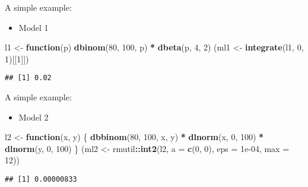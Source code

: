 \documentclass[12pt,ignorenonframetext,aspectratio=169]{beamer}
\newenvironment{Shaded}{\begin{snugshade}}{\end{snugshade}}
\newcommand{\ControlFlowTok}[1]{\textcolor[rgb]{0.13,0.29,0.53}{\textbf{#1}}}
\newcommand{\DataTypeTok}[1]{\textcolor[rgb]{0.13,0.29,0.53}{#1}}
\newcommand{\DecValTok}[1]{\textcolor[rgb]{0.00,0.00,0.81}{#1}}
\newcommand{\FloatTok}[1]{\textcolor[rgb]{0.00,0.00,0.81}{#1}}
\newcommand{\KeywordTok}[1]{\textcolor[rgb]{0.13,0.29,0.53}{\textbf{#1}}}
\newcommand{\NormalTok}[1]{#1}
\newcommand{\OperatorTok}[1]{\textcolor[rgb]{0.81,0.36,0.00}{\textbf{#1}}}
\newcommand{\StringTok}[1]{\textcolor[rgb]{0.31,0.60,0.02}{#1}}
\providecommand{\tightlist}{%
  \setlength{\itemsep}{0pt}\setlength{\parskip}{0pt}}
\begin{document}
\begin{frame}[fragile]{A simple example:}
\protect\hypertarget{a-simple-example}{}

\begin{itemize}
\tightlist
\item
  Model 1
\end{itemize}

\begin{Shaded}
\begin{Highlighting}[]
\NormalTok{l1 <-}\StringTok{ }\ControlFlowTok{function}\NormalTok{(p) }\KeywordTok{dbinom}\NormalTok{(}\DecValTok{80}\NormalTok{, }\DecValTok{100}\NormalTok{, p) }\OperatorTok{*}\StringTok{ }\KeywordTok{dbeta}\NormalTok{(p, }\DecValTok{4}\NormalTok{, }\DecValTok{2}\NormalTok{)}
\NormalTok{(ml1 <-}\StringTok{ }\KeywordTok{integrate}\NormalTok{(l1, }\DecValTok{0}\NormalTok{, }\DecValTok{1}\NormalTok{)[[}\DecValTok{1}\NormalTok{]])}
\end{Highlighting}
\end{Shaded}

\begin{verbatim}
## [1] 0.02
\end{verbatim}

\end{frame}

\begin{frame}[fragile]{A simple example:}
\protect\hypertarget{a-simple-example-1}{}

\begin{itemize}
\tightlist
\item
  Model 2
\end{itemize}

\begin{Shaded}
\begin{Highlighting}[]
\NormalTok{l2 <-}\StringTok{ }\ControlFlowTok{function}\NormalTok{(x, y) \{}
  \KeywordTok{dbbinom}\NormalTok{(}\DecValTok{80}\NormalTok{, }\DecValTok{100}\NormalTok{, x, y) }\OperatorTok{*}\StringTok{ }\KeywordTok{dlnorm}\NormalTok{(x, }\DecValTok{0}\NormalTok{, }\DecValTok{100}\NormalTok{) }\OperatorTok{*}
\StringTok{    }\KeywordTok{dlnorm}\NormalTok{(y, }\DecValTok{0}\NormalTok{, }\DecValTok{100}\NormalTok{)}
\NormalTok{\}}
\NormalTok{(ml2 <-}\StringTok{ }\NormalTok{rmutil}\OperatorTok{::}\KeywordTok{int2}\NormalTok{(l2, }\DataTypeTok{a =} \KeywordTok{c}\NormalTok{(}\DecValTok{0}\NormalTok{, }\DecValTok{0}\NormalTok{), }\DataTypeTok{eps =} \FloatTok{1e-04}\NormalTok{, }\DataTypeTok{max =} \DecValTok{12}\NormalTok{))}
\end{Highlighting}
\end{Shaded}

\begin{verbatim}
## [1] 0.00000833
\end{verbatim}

\end{frame}
\end{document}
